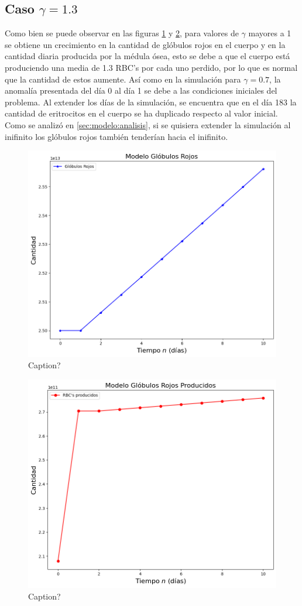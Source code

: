 \subsection{Caso $\gamma=1.3$}
Como bien se puede observar en las figuras \ref{sec:modelo:fig:G13RBC} y \ref{sec:modelo:fig:G13SC}, para valores de $\gamma$ mayores a 1 se obtiene un crecimiento en la cantidad de glóbulos rojos en el cuerpo y en la cantidad diaria producida por la médula ósea, esto se debe a que el cuerpo está produciendo una media de 1.3 RBC's por cada uno perdido, por lo que es normal que la cantidad de estos aumente. Así como en la simulación para $\gamma = 0.7$, la anomalía presentada del día 0 al día 1 se debe a las condiciones iniciales del problema. Al extender los días de la simulación, se encuentra que en el día 183 la cantidad de eritrocitos en el cuerpo se ha duplicado respecto al valor inicial. Como se analizó en \ref{sec:modelo:analisis}, si se quisiera extender la simulación al inifinito los glóbulos rojos también tenderían hacia el inifinito. 
\begin{figure}[h]
    \centering
    \includegraphics[scale=0.55]{figures/BaseG13RBC.png}
    \caption{Caption?}
    \label{sec:modelo:fig:G13RBC}
\end{figure}

\begin{figure}[h]
    \centering
    \includegraphics[scale=0.55]{figures/BaseG13SC.png}
    \caption{Caption?}
    \label{sec:modelo:fig:G13SC}
\end{figure}